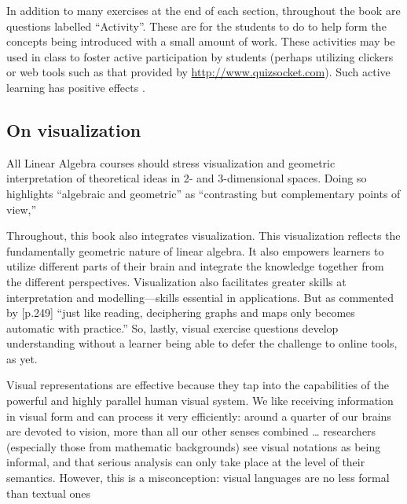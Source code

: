 In addition to many exercises at the end of each section, throughout the book are questions labelled ``Activity''.
These are for the students to do to help form the concepts being introduced with a small amount of work.
These activities may be used in class to foster active participation by students (perhaps utilizing clickers or web tools such as that provided by \url{http://www.quizsocket.com}).
Such active learning has positive effects \cite[]{ED498555}.




\subsection*{On visualization}

\begin{quoted}{\cite{CUPMguide2015}}%
All Linear Algebra courses should stress visualization and geometric interpretation of theoretical ideas in 2- and 3-dimensional spaces. Doing so highlights ``algebraic and geometric'' as ``contrasting but complementary points of view,''
\end{quoted}


Throughout, this book also integrates visualization.
This visualization reflects the fundamentally geometric nature of linear algebra.  
It also empowers learners to utilize different parts of their brain and integrate the knowledge together from the different perspectives.
Visualization also facilitates greater skills at interpretation and modelling---skills essential in applications.
But as commented by \cite{Fara2009} [p.249] ``just like reading, deciphering graphs and maps only becomes automatic with practice.''
So, lastly, visual exercise questions develop understanding without a learner being able to defer the challenge to online tools, as yet.  

\begin{quoted}{\cite{Moody2009}}
Visual representations are effective because they tap into the capabilities of the powerful and highly parallel human visual system.
We like receiving information in visual form and can process it very efficiently: around a quarter of our brains are devoted to vision, more than all our other senses combined  \ldots
researchers (especially those from mathematic backgrounds) see visual notations as being informal, and that serious analysis can only take place at the level of their semantics. 
However, this is a misconception: visual languages are no less formal than textual ones
\end{quoted}









